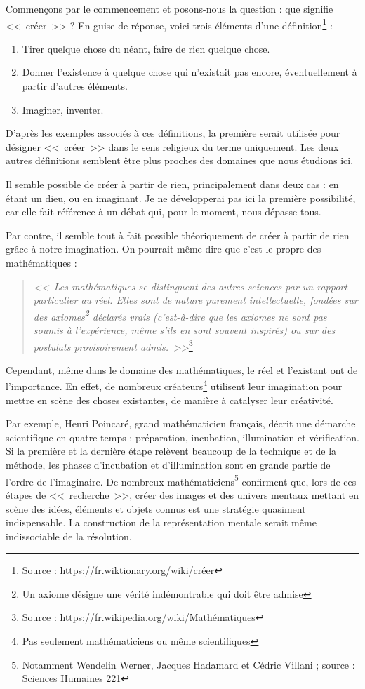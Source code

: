 Commençons par le commencement et posons-nous la question : que signifie <<~créer~>> ?
En guise de réponse, voici trois éléments d'une définition\footnote{Source : \url{https://fr.wiktionary.org/wiki/créer}} :

\begin{enumerate}
\item Tirer quelque chose du néant, faire de rien quelque chose.
\item Donner l'existence à quelque chose qui n'existait pas encore, éventuellement à partir d'autres éléments.
\item Imaginer, inventer.
\end{enumerate}\bigskip

D'après les exemples associés à ces définitions, la première serait utilisée pour désigner <<~créer~>> dans le sens religieux du terme uniquement.
Les deux autres définitions semblent être plus proches des domaines que nous étudions ici.

Il semble possible de créer à partir de rien, principalement dans deux cas : en étant un dieu, ou en imaginant.
Je ne développerai pas ici la première possibilité, car elle fait référence à un débat qui, pour le moment, nous dépasse tous.

Par contre, il semble tout à fait possible théoriquement de créer à partir de rien grâce à notre imagination.
On pourrait même dire que c'est le propre des mathématiques :

\begin{quotation}
\begin{flushright}
\textit{<<~Les mathématiques se distinguent des autres sciences par un rapport particulier au réel.
Elles sont de nature purement intellectuelle, fondées sur des axiomes\footnote{Un axiome désigne une vérité indémontrable qui doit être admise} déclarés vrais (c'est-à-dire que les axiomes ne sont pas soumis à l'expérience, même s'ils en sont souvent inspirés) ou sur des postulats provisoirement admis.~>>}\footnote{Source : \url{https://fr.wikipedia.org/wiki/Mathématiques}}
\end{flushright}
\end{quotation}

Cependant, même dans le domaine des mathématiques, le réel et l'existant ont de l'importance.
En effet, de nombreux créateurs\footnote{Pas seulement mathématiciens ou même scientifiques} utilisent leur imagination pour mettre en scène des choses existantes, de manière à catalyser leur créativité.

Par exemple, Henri Poincaré, grand mathématicien français, décrit une démarche scientifique en quatre temps : préparation, incubation, illumination et vérification.
Si la première et la dernière étape relèvent beaucoup de la technique et de la méthode, les phases d'incubation et d'illumination sont en grande partie de l'ordre de l'imaginaire.
De nombreux mathématiciens\footnote{Notamment Wendelin Werner, Jacques Hadamard et Cédric Villani ; source : Sciences Humaines \no{}221} confirment que, lors de ces étapes de <<~recherche~>>, créer des images et des univers mentaux mettant en scène des idées, éléments et objets connus est une stratégie quasiment indispensable. La construction de la représentation mentale serait même indissociable de la résolution.

